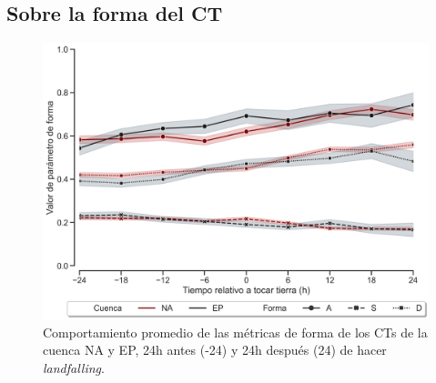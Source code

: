 \subsection{Sobre la forma del CT}
\begin{frame}
\begin{figure}
    \centering
    \includegraphics[scale = 0.3]{Images/Figures/Fig_3_32.jpeg}
    \caption{Comportamiento promedio de las métricas de forma de los CTs de la cuenca {\red NA} y {\gray EP}, 24h antes (-24) y 24h después (24) de hacer \textit{landfalling}.}
    \label{fig:fig_10}
\end{figure}
\end{frame}
